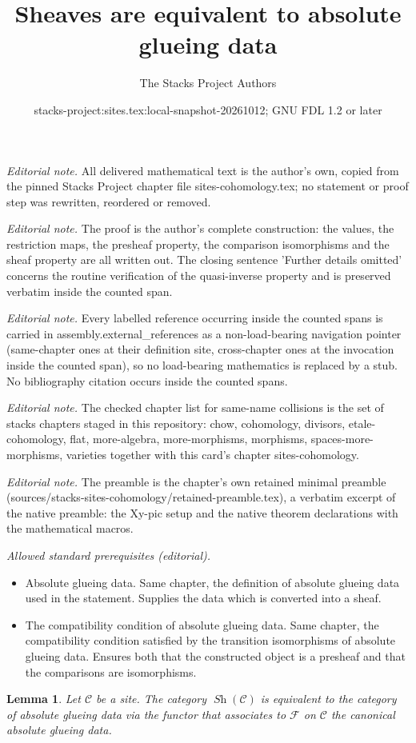 \documentclass[10pt,a4paper]{amsart}
\title{Sheaves are equivalent to absolute glueing data}
\author{The Stacks Project Authors}
\date{stacks-project:sites.tex:local-snapshot-20261012; GNU FDL 1.2 or later}
\theoremstyle{plain}
\newtheorem{lemma}[subsection]{Lemma}
\theoremstyle{definition}
\theoremstyle{remark}
\numberwithin{equation}{subsection}
\def\Sh{\mathop{\mathit{Sh}}\nolimits}
\begin{document}
\maketitle
\noindent\textit{Editorial note.} All delivered mathematical text is the author's own, copied from the pinned Stacks Project chapter file sites-cohomology.tex; no statement or proof step was rewritten, reordered or removed.\par\medskip
\noindent\textit{Editorial note.} The proof is the author's complete construction: the values, the restriction maps, the presheaf property, the comparison isomorphisms and the sheaf property are all written out. The closing sentence 'Further details omitted' concerns the routine verification of the quasi-inverse property and is preserved verbatim inside the counted span.\par\medskip
\noindent\textit{Editorial note.} Every labelled reference occurring inside the counted spans is carried in assembly.external\_references as a non-load-bearing navigation pointer (same-chapter ones at their definition site, cross-chapter ones at the invocation inside the counted span), so no load-bearing mathematics is replaced by a stub. No bibliography citation occurs inside the counted spans.\par\medskip
\noindent\textit{Editorial note.} The checked chapter list for same-name collisions is the set of stacks chapters staged in this repository: chow, cohomology, divisors, etale-cohomology, flat, more-algebra, more-morphisms, morphisms, spaces-more-morphisms, varieties together with this card's chapter sites-cohomology.\par\medskip
\noindent\textit{Editorial note.} The preamble is the chapter's own retained minimal preamble (sources/stacks-sites-cohomology/retained-preamble.tex), a verbatim excerpt of the native preamble: the Xy-pic setup and the native theorem declarations with the mathematical macros.\par\medskip
\noindent\textit{Allowed standard prerequisites (editorial).}\begin{itemize}
\item Absolute glueing data. Same chapter, the definition of absolute glueing data used in the statement. Supplies the data which is converted into a sheaf.
\item The compatibility condition of absolute glueing data. Same chapter, the compatibility condition satisfied by the transition isomorphisms of absolute glueing data. Ensures both that the constructed object is a presheaf and that the comparisons are isomorphisms.
\end{itemize}\medskip
\begin{lemma}
\label{lemma-glue-sheaves-absolute}
Let $\mathcal{C}$ be a site. The category
$\Sh(\mathcal{C})$ is equivalent to the category
of absolute glueing data via the functor that
associates to $\mathcal{F}$ on $\mathcal{C}$ the
canonical absolute glueing data.
\end{lemma}
\end{document}
